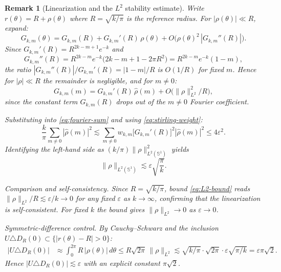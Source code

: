 \documentclass[a4paper,11pt,reqno]{amsart}
\newtheorem{remark}{Remark}[section]
\begin{document}
\begin{remark}[Linearization and the $L^2$ stability estimate]
\label{rem:L2-stab}
Write $r(\theta)=R+\rho(\theta)$ where $R=\sqrt{k/\pi}$ is the reference radius.
For $|\rho(\theta)|\ll R$, expand:
\[
G_{k,m}(\theta)=G_{k,m}(R)+G_{k,m}'(R)\,\rho(\theta)+O\!\bigl(\rho(\theta)^2\,|G_{k,m}''(R)|\bigr).
\]
Since $G_{k,m}'(R)=R^{2k-m+1}e^{-k}$ and
\[
G_{k,m}''(R)=R^{2k-m}e^{-k}\bigl(2k-m+1-2\pi R^2\bigr)=R^{2k-m}e^{-k}(1-m),
\]
the ratio $|G_{k,m}''(R)|/G_{k,m}'(R)=|1-m|/R$ is $O(1/R)$ for fixed $m$.
Hence for $|\rho|\ll R$ the remainder is negligible, and for $m\neq0$:
\[
\widehat{G_{k,m}}(m)=G_{k,m}'(R)\,\hat\rho(m)+O\bigl(\|\rho\|_{L^2}^2/R\bigr),
\]
since the constant term $G_{k,m}(R)$ drops out of the $m\neq0$ Fourier coefficient.

Substituting into \eqref{eq:fourier-sum} and using \eqref{eq:stirling-weight}:
\[
\frac{k}{\pi}\!\sum_{m\neq0}|\hat\rho(m)|^2
\lesssim
\sum_{m\neq0}w_{k,m}\bigl[G_{k,m}'(R)\bigr]^2|\hat\rho(m)|^2
\le4\varepsilon^2.
\]
Identifying the left-hand side as $(k/\pi)\|\rho\|_{L^2(\mathbb{S}^1)}^2$ yields
\begin{equation}\label{eq:L2-bound}
\boxed{\|\rho\|_{L^2(\mathbb{S}^1)}\lesssim\varepsilon\sqrt{\frac{\pi}{k}}.}
\end{equation}

\smallskip
\noindent\emph{Comparison and self-consistency.}
Since $R=\sqrt{k/\pi}$, bound \eqref{eq:L2-bound} reads $\|\rho\|_{L^2}/R\lesssim\varepsilon/k\to0$
for any fixed $\varepsilon$ as $k\to\infty$, confirming that the linearization is self-consistent.
For fixed $k$ the bound gives $\|\rho\|_{L^2}\to0$ as $\varepsilon\to0$.

\smallskip
\noindent\emph{Symmetric-difference control.}
By Cauchy--Schwarz and the inclusion $U\triangle D_R(0)\subset\{|r(\theta)-R|>0\}$:
\begin{align*}
|U\triangle D_R(0)|
&\approx\int_0^{2\pi}R\,|\rho(\theta)|\,d\theta
\le R\sqrt{2\pi}\,\|\rho\|_{L^2}
\lesssim \sqrt{k/\pi}\cdot\sqrt{2\pi}\cdot\varepsilon\sqrt{\pi/k}
=\varepsilon\pi\sqrt{2}.
\end{align*}
Hence $|U\triangle D_R(0)|\lesssim\varepsilon$ with an explicit constant $\pi\sqrt{2}$.
\end{remark}
\end{document}
